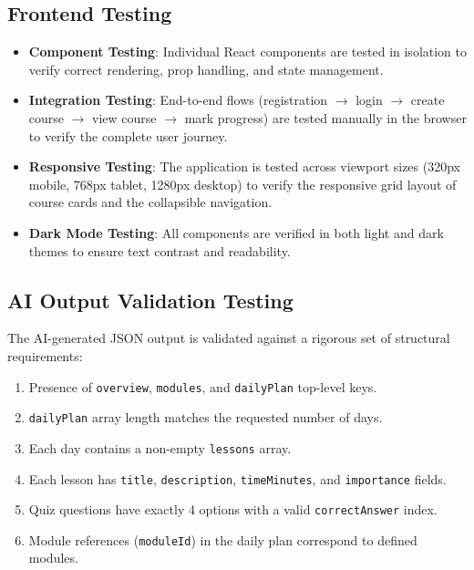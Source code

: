 \documentclass[12pt,a4paper]{report}
\begin{document}
\subsection{Frontend Testing}
\begin{itemize}[noitemsep]
    \item \textbf{Component Testing}: Individual React components are tested in isolation to verify correct rendering, prop handling, and state management.
    \item \textbf{Integration Testing}: End-to-end flows (registration $\to$ login $\to$ create course $\to$ view course $\to$ mark progress) are tested manually in the browser to verify the complete user journey.
    \item \textbf{Responsive Testing}: The application is tested across viewport sizes (320px mobile, 768px tablet, 1280px desktop) to verify the responsive grid layout of course cards and the collapsible navigation.
    \item \textbf{Dark Mode Testing}: All components are verified in both light and dark themes to ensure text contrast and readability.
\end{itemize}

\subsection{AI Output Validation Testing}
The AI-generated JSON output is validated against a rigorous set of structural requirements:
\begin{enumerate}[noitemsep]
    \item Presence of \texttt{overview}, \texttt{modules}, and \texttt{dailyPlan} top-level keys.
    \item \texttt{dailyPlan} array length matches the requested number of days.
    \item Each day contains a non-empty \texttt{lessons} array.
    \item Each lesson has \texttt{title}, \texttt{description}, \texttt{timeMinutes}, and \texttt{importance} fields.
    \item Quiz questions have exactly 4 options with a valid \texttt{correctAnswer} index.
    \item Module references (\texttt{moduleId}) in the daily plan correspond to defined modules.
\end{enumerate}
\end{document}

